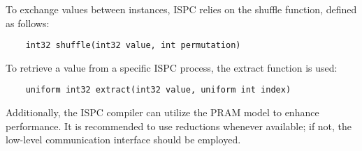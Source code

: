 To exchange values between instances, ISPC relies on the shuffle function, defined as follows:
\begin{verbatim}
    int32 shuffle(int32 value, int permutation)
\end{verbatim}
To retrieve a value from a specific ISPC process, the extract function is used:
\begin{verbatim}
    uniform int32 extract(int32 value, uniform int index)
\end{verbatim}

Additionally, the ISPC compiler can utilize the PRAM model to enhance performance. 
It is recommended to use reductions whenever available; if not, the low-level communication interface should be employed.